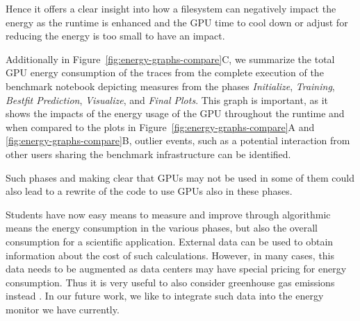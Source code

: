 \documentclass[utf8]{FrontiersinVancouver} %
\begin{document}
Hence it offers a clear insight into how a filesystem can negatively impact the energy as the runtime is enhanced and the GPU time to cool down or adjust for reducing the energy is too small to have an impact.


Additionally in Figure~\ref{fig:energy-graphs-compare}C, we summarize the total GPU energy consumption of the traces from the complete execution of the benchmark notebook depicting measures from the phases {\em Initialize}, {\em Training}, {\em Bestfit Prediction}, {\em Visualize}, and {\em Final Plots}.  This graph is important, as it shows the impacts of the energy usage of the GPU throughout the runtime and when compared to the plots in Figure~\ref{fig:energy-graphs-compare}A and \ref{fig:energy-graphs-compare}B, outlier events, such as a potential interaction from other users sharing the benchmark infrastructure can be identified.

Such phases and making clear that GPUs may not be used in some of them could also lead to a rewrite of the code to use GPUs also in these phases.

Students have now easy means to measure and improve through algorithmic means the energy consumption in the various phases, but also the overall consumption for a scientific application. External data \cite{energy-price} can be used to obtain information about the cost of such calculations. However, in many cases, this data needs to be augmented as data centers may have special pricing for energy consumption. Thus it is very useful to also consider greenhouse gas emissions instead \cite{greenhouse-calc}. In our future work, we like to integrate such data into the energy monitor we have currently.
\end{document}
